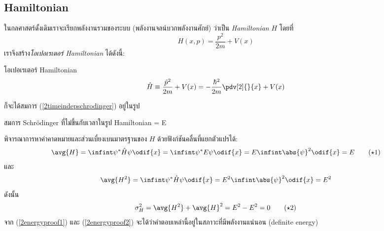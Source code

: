 \subsection{Hamiltonian}

ในกลศาสตร์ดั้งเดิมเราจะเรียกพลังงานรวมของระบบ (พลังงานจลน์บวกพลังงานศักย์) ว่าเป็น \emph{Hamiltonian} $H$ โดยที่
\[
H(x, p) = \frac{p^2}{2m} + V(x)
\]
เราจึงสร้าง\emph{โอเปอเรเตอร์ Hamiltonian} ได้ดังนี้:
\begin{defbox}{โอเปอเรเตอร์ Hamiltonian}
    \begin{equation}
        \hat{H} \equiv \frac{\hat{p}^2}{2m} + V(x) = -\frac{\hbar^2}{2m}\pdv[2]{}{x} + V(x)
    \end{equation}
\end{defbox}
ก็จะได้สมการ (\ref{2timeindepschrodinger}) อยู่ในรูป
\begin{eqbox}{สมการ Schrödinger ที่ไม่ขึ้นกับเวลาในรูป Hamiltonian}
    \psi = E\psi
\end{eqbox}

พิจารณาการหาค่าคาดหมายและส่วนเบี่ยงเบนมาตรฐานของ $H$ ด้วยฟังก์ชันคลื่นที่แยกตัวแปรได้:
\begin{equation}
    \avg{H} = \infint \psi^*\hat{H}\psi\odif{x} = \infint \psi^* E\psi\odif{x} = E \infint \abs{\psi}^2 \odif{x} = E\tag{$\star$1}\label{2energyproof1}
\end{equation}
และ
\[
\avg{H^2} = \infint \psi^*\hat{H}\psi\odif{x} = E^2\infint\abs{\psi}^2\odif{x} = E^2
\]
ดังนั้น
\begin{equation}
    \sigma_H^2 = \avg{H^2} + \avg{H}^2 = E^2 - E^2 = 0\tag{$\star$2}\label{2energyproof2}
\end{equation}
จาก (\ref{2energyproof1}) และ (\ref{2energyproof2}) จะได้ว่าคำตอบเหล่านี้อยู่ในสภาวะที่มีพลังงานแน่นอน (definite energy)